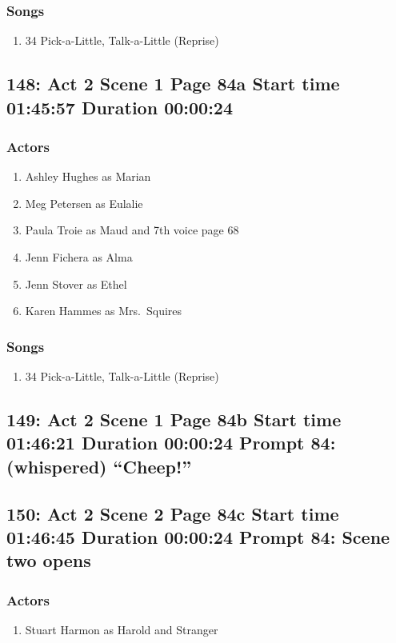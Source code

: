 \subsubsection{Songs}
\begin{enumerate}
\item 34 Pick-a-Little, Talk-a-Little (Reprise)
\end{enumerate}
\subsection{148: Act 2 Scene 1 Page 84a Start time 01:45:57 Duration 00:00:24}

\subsubsection{Actors}
\begin{enumerate}
\item Ashley Hughes as Marian
\item Meg Petersen as Eulalie
\item Paula Troie as Maud and 7th voice page 68
\item Jenn Fichera as Alma
\item Jenn Stover as Ethel
\item Karen Hammes as Mrs.~Squires
\end{enumerate}

\subsubsection{Songs}
\begin{enumerate}
\item 34 Pick-a-Little, Talk-a-Little (Reprise)
\end{enumerate}
\subsection{149: Act 2 Scene 1 Page 84b Start time 01:46:21 Duration 00:00:24 Prompt 84: (whispered) ``Cheep!''}

\subsection{150: Act 2 Scene 2 Page 84c Start time 01:46:45 Duration 00:00:24 Prompt 84: Scene two opens}

\subsubsection{Actors}
\begin{enumerate}
\item Stuart Harmon as Harold and Stranger
\end{enumerate}
